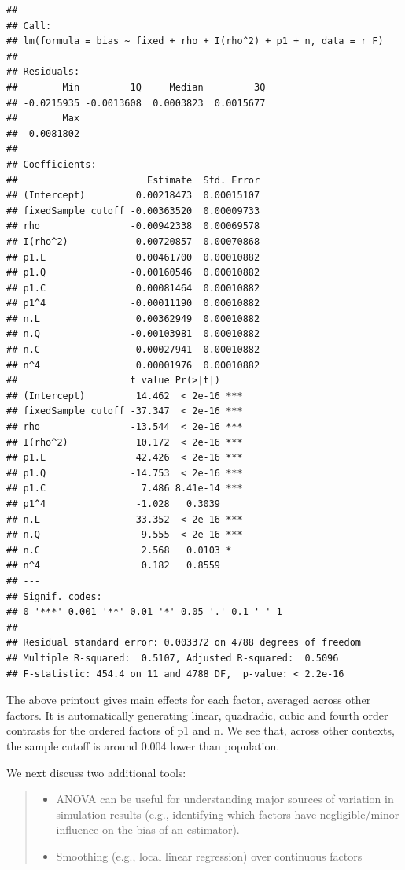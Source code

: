 \documentclass[
]{book}
\providecommand{\tightlist}{%
  \setlength{\itemsep}{0pt}\setlength{\parskip}{0pt}}
\begin{document}
\begin{verbatim}
## 
## Call:
## lm(formula = bias ~ fixed + rho + I(rho^2) + p1 + n, data = r_F)
## 
## Residuals:
##        Min         1Q     Median         3Q 
## -0.0215935 -0.0013608  0.0003823  0.0015677 
##        Max 
##  0.0081802 
## 
## Coefficients:
##                       Estimate  Std. Error
## (Intercept)         0.00218473  0.00015107
## fixedSample cutoff -0.00363520  0.00009733
## rho                -0.00942338  0.00069578
## I(rho^2)            0.00720857  0.00070868
## p1.L                0.00461700  0.00010882
## p1.Q               -0.00160546  0.00010882
## p1.C                0.00081464  0.00010882
## p1^4               -0.00011190  0.00010882
## n.L                 0.00362949  0.00010882
## n.Q                -0.00103981  0.00010882
## n.C                 0.00027941  0.00010882
## n^4                 0.00001976  0.00010882
##                    t value Pr(>|t|)    
## (Intercept)         14.462  < 2e-16 ***
## fixedSample cutoff -37.347  < 2e-16 ***
## rho                -13.544  < 2e-16 ***
## I(rho^2)            10.172  < 2e-16 ***
## p1.L                42.426  < 2e-16 ***
## p1.Q               -14.753  < 2e-16 ***
## p1.C                 7.486 8.41e-14 ***
## p1^4                -1.028   0.3039    
## n.L                 33.352  < 2e-16 ***
## n.Q                 -9.555  < 2e-16 ***
## n.C                  2.568   0.0103 *  
## n^4                  0.182   0.8559    
## ---
## Signif. codes:  
## 0 '***' 0.001 '**' 0.01 '*' 0.05 '.' 0.1 ' ' 1
## 
## Residual standard error: 0.003372 on 4788 degrees of freedom
## Multiple R-squared:  0.5107, Adjusted R-squared:  0.5096 
## F-statistic: 454.4 on 11 and 4788 DF,  p-value: < 2.2e-16
\end{verbatim}

The above printout gives main effects for each factor, averaged across other factors.
It is automatically generating linear, quadradic, cubic and fourth order contrasts for the ordered factors of p1 and n.
We see that, across other contexts, the sample cutoff is around 0.004 lower than population.

We next discuss two additional tools:

\begin{quote}
\begin{itemize}
\tightlist
\item
  ANOVA can be useful for understanding major sources of variation in simulation results (e.g., identifying which factors have negligible/minor influence on the bias of an estimator).
\item
  Smoothing (e.g., local linear regression) over continuous factors
\end{itemize}
\end{quote}
\end{document}
